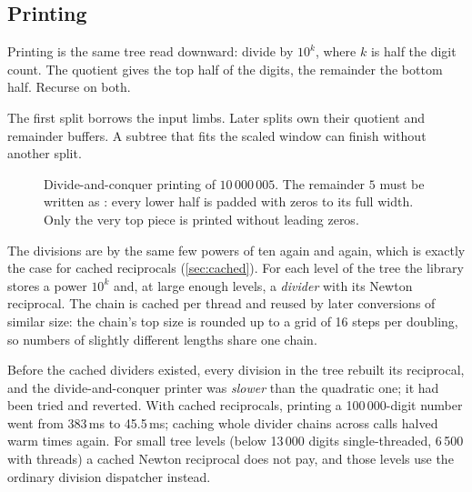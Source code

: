 \subsection{Printing}

Printing is the same tree read downward: divide by $10^{k}$, where $k$ is half the digit count.
The quotient gives the top half of the digits, the remainder the bottom half. Recurse on both.

The first split borrows the input limbs. Later splits own their quotient and
remainder buffers. A subtree that fits the scaled window can finish without
another split.

\begin{figure}[ht]
\centering
{}
\caption{Divide-and-conquer printing of $10\,000\,005$. The remainder $5$ must be written as
: every lower half is padded with zeros to its full width. Only the very top
piece is printed without leading zeros.}
\end{figure}

The divisions are by the same few powers of ten again and again, which is exactly the case
for cached reciprocals (\cref{sec:cached}). For each level of the tree the library stores a
power $10^{k}$ and, at large enough levels, a \emph{divider} with its Newton reciprocal.
The chain is cached
per thread and reused by later conversions of similar size: the chain's top size is rounded
up to a grid of 16 steps per doubling, so numbers of slightly different lengths share one
chain.

\begin{perfnote}
Before the cached dividers existed, every division in the tree rebuilt its reciprocal, and the
divide-and-conquer printer was \emph{slower} than the quadratic one; it had been tried and
reverted. With cached reciprocals, printing a 100\,000-digit number went from 383\,ms to
45.5\,ms; caching whole divider chains across calls halved warm times again. For small tree
levels (below 13\,000 digits single-threaded, 6\,500 with threads) a cached Newton reciprocal
does not pay, and those levels use the ordinary division dispatcher instead.
\end{perfnote}

